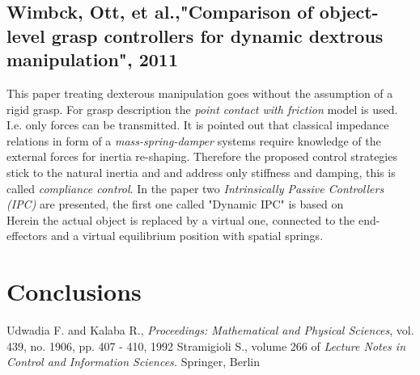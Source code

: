 \documentclass[conference]{IEEEtran}
\begin{document}
\subsection{Wimbck, Ott, et al.,"Comparison of object-level grasp controllers for dynamic dextrous manipulation", 2011}
This paper treating dexterous manipulation goes without the assumption of a rigid grasp. For grasp description the \textit{point contact with friction }model is used. I.e. only forces can be transmitted. It is pointed out that classical impedance relations in form of a \textit{mass-spring-damper} systems require knowledge of the external forces for inertia re-shaping. Therefore the proposed control strategies stick to the natural inertia and and address only stiffness and damping, this is called \textit{compliance control}. In the paper two \textit{Intrinsically Passive Controllers (IPC)} are presented, the first one called "Dynamic IPC" is based on \cite{Stramigioli2001}\\
Herein the actual object is replaced by a virtual one, connected to the end-effectors and a virtual equilibrium position with spatial springs. 



\section{Conclusions}


%


\begin{thebibliography}{1}

Udwadia F. and Kalaba R.,
\newblock  \textit{Proceedings: Mathematical and Physical Sciences}, vol. 439, no. 1906, pp. 407 - 410, 1992
Stramigioli S.,
\newblock volume 266 of \textit{Lecture Notes in Control and Information Sciences.}
\newblock Springer, Berlin



\end{thebibliography}




\end{document}
